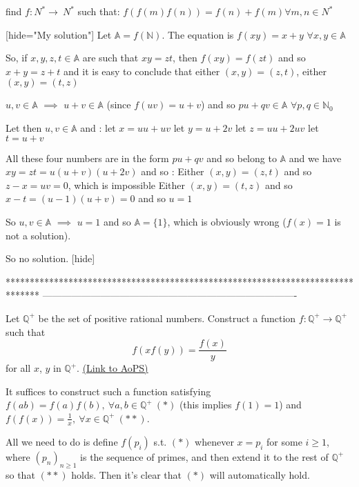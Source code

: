 \begin{solution}
	\begin{tcolorbox}find $ f: N^{*}\to\ N^{*}$ such that:
 $ f(f(m)f(n)) = f(n) + f(m) \forall m,n \in N^{*}$\end{tcolorbox}

[hide="My solution"]
Let $ \mathbb A = f(\mathbb N)$. The equation is $ f(xy) = x + y$ $ \forall x,y\in\mathbb A$

So, if $ x,y,z,t\in\mathbb A$ are such that $ xy = zt$, then $ f(xy) = f(zt)$ and so $ x + y = z + t$ and it is easy to conclude that either $ (x,y) = (z,t)$, either $ (x,y) = (t,z)$

$ u,v\in\mathbb A$ $ \implies$ $ u + v\in\mathbb A$ (since $ f(uv) = u + v$) and so $ pu + qv\in\mathbb A$ $ \forall p,q\in\mathbb N_0$

Let then $ u,v\in\mathbb A$ and :
let $ x = uu + uv$
let $ y = u + 2v$
let $ z = uu + 2uv$
let $ t = u + v$

All these four numbers are in the form $ pu + qv$ and so belong to $ \mathbb A$ and we have $ xy = zt = u(u + v)(u + 2v)$ and so :
Either $ (x,y) = (z,t)$ and so $ z - x = uv = 0$, which is impossible
Either $ (x,y) = (t,z)$ and so $ x - t = (u - 1)(u + v) = 0$ and so $ u = 1$

So $ u,v\in\mathbb A$ $ \implies$ $ u = 1$ and so $ \mathbb A = \{1\}$, which is obviously wrong ($ f(x) = 1$ is not a solution).

So no solution.
[\/hide]
\end{solution}
*******************************************************************************
-------------------------------------------------------------------------------

\begin{problem}
	Let $ {\mathbb Q}^ +$ be the set of positive rational numbers. Construct a function $ f : {\mathbb Q}^ + \rightarrow {\mathbb Q}^ +$ such that
\[ f(xf(y)) = \frac {f(x)}{y}
\]
for all $ x$, $ y$ in $ {\mathbb Q}^ +$.
	\flushright \href{https://artofproblemsolving.com/community/c6h60742}{(Link to AoPS)}
\end{problem}



\begin{solution}
	It suffices to construct such a function satisfying $f(ab)=f(a)f(b),\ \forall a,b\in\mathbb Q^+\ (*)$ (this implies $f(1)=1$) and $f(f(x))=\frac 1x,\ \forall x\in\mathbb Q^+\ (**)$.

All we need to do is define $f(p_i)$ s.t. $(*)$ whenever $x=p_i$ for some $i\ge 1$, where $(p_n)_{n\ge 1}$ is the sequence of primes, and then extend it to the rest of $\mathbb Q^+$ so that $(**)$ holds. Then it's clear that $(*)$ will automatically hold.
\end{solution}



